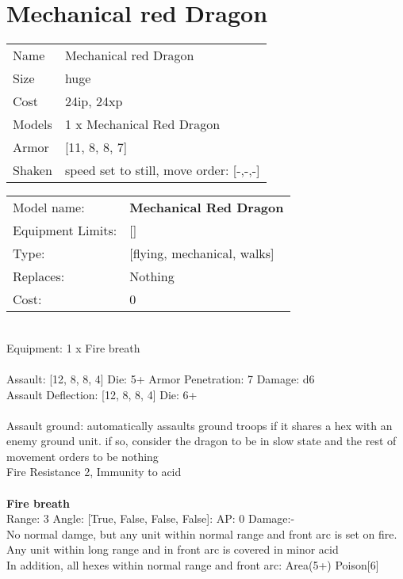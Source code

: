 \pagebreak

\section{ Mechanical red Dragon }

\begin{tabular}{ll}
  Name & Mechanical red Dragon \\
  Size & huge\\
  Cost & 24ip, 24xp\\
  Models & 1 x Mechanical Red Dragon\\
  Armor & [11, 8, 8, 7]\\
  Shaken & speed set to still, move order: [-,-,-]\\
\end{tabular}

\noindent 

\noindent
\begin{tabular}{ll}
Model name: &{\bf Mechanical Red Dragon } \\
Equipment Limits: &[] \\
Type: &[flying, mechanical, walks] \\
Replaces: &Nothing \\
Cost: & 0\\
\end{tabular}
\ \\
Equipment: 1 x Fire breath \\
\ \\
Assault: [12, 8, 8, 4] Die: 5+ Armor Penetration: 7 Damage: d6 \\
Assault Deflection: [12, 8, 8, 4] Die: 6+\\
\indent  
\ \\
Assault ground: automatically assaults ground troops if it shares a hex with an enemy ground unit. if so, consider the dragon to be in slow state and the rest of movement orders to be nothing\\ 
Fire Resistance 2, Immunity to acid\\ 

\ \\
{\bf Fire breath } \\



Range: 3  Angle: [True, False, False, False]: AP: 0 Damage:- \\
No normal damge, but any unit within normal range and front arc is set on fire. Any unit within long range and in front arc is covered in minor acid\\ 
In addition, all hexes within normal range and front arc: Area(5+) Poison[6]\\ 




